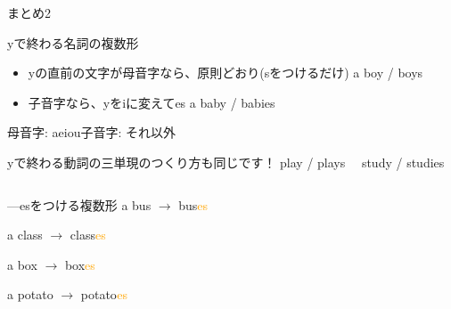 \documentclass[aspectratio=169,xcolor={dvipsnames,table}]{beamer}
\begin{document}
\begin{frame}[plain]{まとめ2}
 \begin{block}{yで終わる名詞の複数形}\small
\begin{itemize}[square]
 \item yの直前の文字が母音字なら、原則どおり(sをつけるだけ)%
       \hfill{\scriptsize a boy / boys}
 \item \phantom{yの直前の文字が}子音字なら、yをiに変えてes
       \hfill{\scriptsize a baby / babies}
\end{itemize}
\hfill{\scriptsize 母音字: aeiou\hspace{10pt}子音字: それ以外}
\end{block}

\vspace*{-15pt}
\hfill{\scriptsize yで終わる動詞の三単現のつくり方も同じです！ play / plays\,\,\,\,\,\,\,\,study / studies}


\vspace*{-10pt}
\pause

\begin{columns}
\begin{column}[t]{.385\textwidth}
\begin{block}{---esをつける複数形}\small
a bus $\longrightarrow$ bus\textcolor{orange}{es}%
\hfill{}\hspace*{15pt}

a class $\longrightarrow$ class\textcolor{orange}{es}
\hfill{}\hspace*{15pt}

a box  $\longrightarrow$ box\textcolor{orange}{es}
\hfill{}\hspace*{15pt}

a potato $\longrightarrow$ potato\textcolor{orange}{es}
\hfill{}\hspace*{15pt}


\end{block}
\end{column}
\end{columns}
\end{frame}
\end{document}

